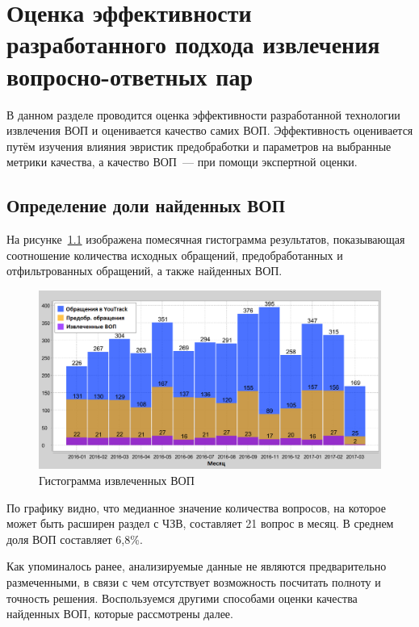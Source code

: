 \chapter{Оценка эффективности разработанного подхода извлечения вопросно-ответных пар}
\label{chap:quality}

В данном разделе проводится оценка эффективности разработанной технологии извлечения ВОП и оценивается качество самих ВОП. Эффективность оценивается путём изучения влияния эвристик предобработки и параметров на выбранные метрики качества, а качество ВОП~--- при помощи экспертной оценки.

\section{Определение доли найденных ВОП}

На рисунке~\ref{fig:tickets_distr} изображена помесячная гистограмма результатов, показывающая соотношение количества исходных обращений, предобработанных и отфильтрованных обращений, а также найденных ВОП. 

\begin{figure}[tph!]
\centerline{\includegraphics[width=11.5cm]{fig/tickets_distr.png}}
    \caption{Гистограмма извлеченных ВОП}
    \label{fig:tickets_distr}
\end{figure}

По графику видно, что медианное значение количества вопросов, на которое может быть расширен раздел с ЧЗВ, составляет 21 вопрос в месяц. В среднем доля ВОП составляет 6,8\%.

Как упоминалось ранее, анализируемые данные не являются предварительно размеченными, в связи с чем отсутствует возможность посчитать полноту и точность решения. Воспользуемся другими способами оценки качества найденных ВОП, которые рассмотрены далее.

